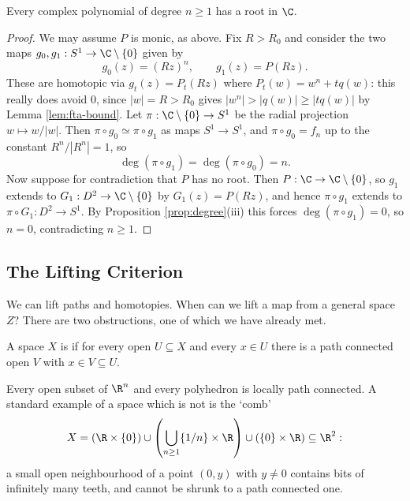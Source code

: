 \begin{theorem}
	Every complex polynomial of degree $n \geq 1$ has a root in $\C$.
\end{theorem}
\begin{proof}
	We may assume $P$ is monic, as above. Fix $R > R_0$ and consider the two maps $g_0, g_1: S^1 \to \C \setminus \{0\}$ given by
	$$
	g_0(z) = (Rz)^n, \qquad g_1(z) = P(Rz).
	$$
	These are homotopic via $g_t(z) = P_t(Rz)$ where $P_t(w) = w^n + t q(w)$: this really does avoid $0$, since $|w| = R > R_0$ gives $|w^n| > |q(w)| \geq |tq(w)|$ by Lemma \ref{lem:fta-bound}. Let $\pi: \C \setminus \{0\} \to S^1$ be the radial projection $w \mapsto w/|w|$. Then $\pi \circ g_0 \simeq \pi \circ g_1$ as maps $S^1 \to S^1$, and $\pi \circ g_0 = f_n$ up to the constant $R^n/|R^n|=1$, so
	$$
	\deg(\pi \circ g_1) = \deg (\pi \circ g_0) = n.
	$$
	Now suppose for contradiction that $P$ has no root. Then $P: \C \to \C\setminus\{0\}$, so $g_1$ extends to $G_1: D^2 \to \C \setminus \{0\}$ by $G_1(z) = P(Rz)$, and hence $\pi \circ g_1$ extends to $\pi \circ G_1: D^2 \to S^1$. By Proposition \ref{prop:degree}(iii) this forces $\deg (\pi\circ g_1) = 0$, so $n = 0$, contradicting $n \geq 1$.
\end{proof}

\subsection{The Lifting Criterion}

We can lift paths and homotopies. When can we lift a map from a general space $Z$? There
are two obstructions, one of which we have already met.

\begin{definition}
	A space $X$ is  if for every open $U \subseteq X$ and every $x \in U$ there is a path connected open $V$ with $x \in V \subseteq U$.
\end{definition}

\begin{example}
	Every open subset of $\R^n$ and every polyhedron is locally path connected. A standard example of a space which is not is the `comb'
	$$
	X = (\R \times \{0\}) \cup \left(\bigcup_{n \geq 1}\{1/n\} \times \R\right) \cup (\{0\}\times \R) \subseteq \R^2:
	$$
	a small open neighbourhood of a point $(0,y)$ with $y \neq 0$ contains bits of infinitely many teeth, and cannot be shrunk to a path connected one.
\end{example}

